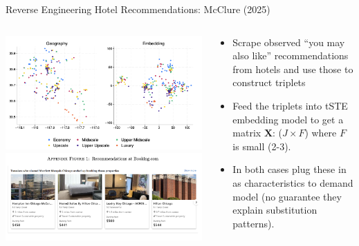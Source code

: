 \documentclass[aspectratio=169,10pt]{beamer}
\begin{document}
\begin{frame}{Reverse Engineering Hotel Recommendations:  McClure (2025)}
\begin{columns}
\begin{column}{0.6\textwidth}
     \includegraphics[height=0.5\textheight]{resources/hotel_embedding}\\
     \includegraphics[height=0.5\textheight]{resources/hotel_ranking}
\end{column}
\begin{column}{0.4\textwidth}
    \begin{itemize}
        \item Scrape observed ``you may also like'' recommendations from hotels and use those to construct \alert{triplets}
        \item Feed the triplets into tSTE embedding model to get a matrix $\mathbf{X}$: ($J \times F$) where $F$ is small (2-3).
        \item In both cases plug these in as characteristics to demand model (no guarantee they explain substitution patterns).
    \end{itemize}
\end{column}
\end{columns}

\end{frame}
\end{document}
